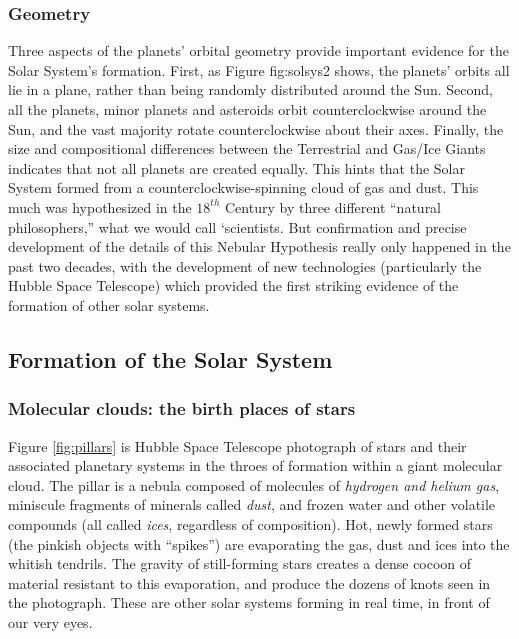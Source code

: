 \subsubsection{Geometry}
Three aspects of the planets' orbital geometry provide important evidence for the Solar System's formation. First, as Figure {fig:solsys2} shows, the planets' orbits all lie in a plane, rather than being randomly distributed around the Sun. Second, all the planets, minor planets and asteroids orbit counterclockwise around the Sun, and the vast majority rotate counterclockwise about their axes. Finally, the size and compositional differences between the Terrestrial and Gas/Ice Giants indicates that not all planets are created equally. This hints that the Solar System formed from a counterclockwise-spinning cloud of gas and dust. This much was hypothesized in the $18^{th}$ Century by three different ``natural philosophers,'' what we would call `scientists. But confirmation and precise development of the details of this Nebular Hypothesis really only happened in the past two decades, with the development of new technologies (particularly the Hubble Space Telescope) which provided the first striking evidence of the formation of other solar systems.\\

\subsection{Formation of the Solar System}
\subsubsection{Molecular clouds: the birth places of stars}
Figure \ref{fig:pillars} is Hubble Space Telescope photograph of stars and their associated planetary systems in the throes of formation within a giant molecular cloud. The pillar is a nebula composed of molecules of \emph{hydrogen and helium gas}, miniscule fragments of minerals called \emph{dust}, and frozen water and other volatile compounds (all called \emph{ices}, regardless of composition). Hot, newly formed stars (the pinkish objects with ``spikes'') are evaporating the gas, dust and ices into the whitish tendrils. The gravity of still-forming stars creates a dense cocoon of material resistant to this evaporation, and produce the dozens of knots seen in the photograph. These are other solar systems forming in real time, in front of our very eyes.\\
%
